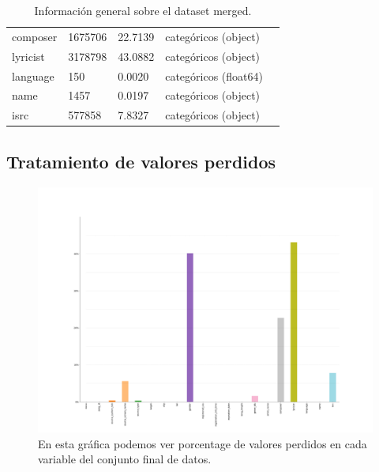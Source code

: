 \documentclass[a4paper]{article}
\begin{document}
\begin{table}[H]
\begin{tabular}{l*{4}l}
composer                 & 1675706           & 22.7139     & categóricos (object)                    \\
lyricist                 & 3178798           & 43.0882     & categóricos (object)                    \\
language                 & 150               & 0.0020      & categóricos (float64)                   \\
name                     & 1457              & 0.0197      & categóricos (object)                    \\
isrc                     & 577858            & 7.8327      & categóricos (object)                    \\
\end{tabular}
\caption{Información general sobre el dataset merged.}
\end{table}

\subsection{Tratamiento de valores perdidos}
\begin{figure}[H]
\centering
\includegraphics[width=1\textwidth]{Images/lost_values_percent.png}
\caption{En esta gráfica podemos ver porcentage de valores perdidos en cada variable del conjunto final de datos.}
\end{figure}
\end{document}
